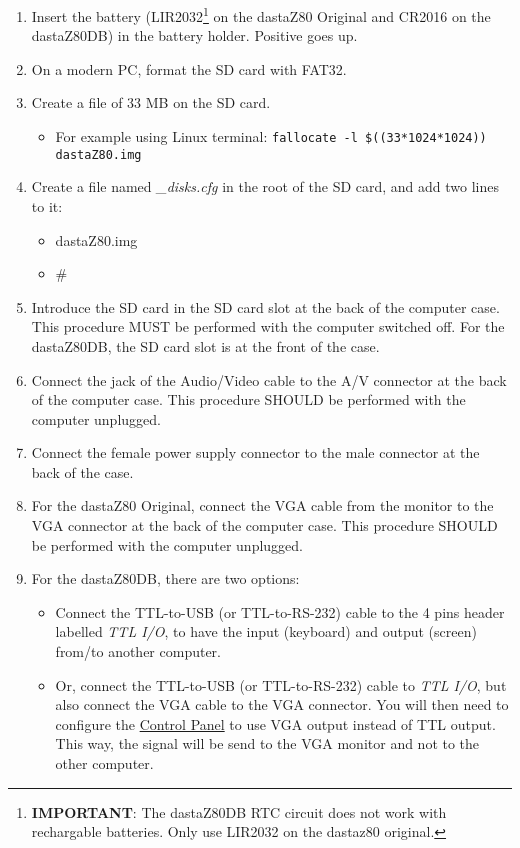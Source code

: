 \begin{enumerate}
    \item Insert the battery (LIR2032\footnote{\textbf{IMPORTANT}: The
    dastaZ80DB RTC circuit does not work with rechargable batteries. Only use
    LIR2032 on the dastaz80 original.} on the dastaZ80 Original and CR2016 on
    the dastaZ80DB) in the battery holder. Positive goes up.
    \item On a modern PC, format the SD card with FAT32.
    \item Create a file of 33 MB on the SD card.
    \begin{itemize}
        \item For example using Linux terminal: \texttt{fallocate -l \$((33*1024*1024)) dastaZ80.img}
    \end{itemize}
    \item Create a file named \textit{\_disks.cfg} in the root of the SD card,
    and add two lines to it:
    \begin{itemize}
        \item dastaZ80.img
        \item \#
    \end{itemize}
    \item Introduce the SD card in the SD card slot at the back of the
        computer case. This procedure MUST be performed with the computer
        switched off. For the dastaZ80DB, the SD card slot is at the front of
        the case.
    \item Connect the jack of the Audio/Video cable to the A/V connector at
        the back of the computer case. This procedure SHOULD be performed with
        the computer unplugged.
    \item Connect the female power supply connector to the male connector at
        the back of the case.
    \item For the dastaZ80 Original, connect the VGA cable from the monitor to
        the VGA connector at the back of the computer case. This procedure
        SHOULD be performed with the computer unplugged.
    \item For the dastaZ80DB, there are two options:
    \begin{itemize}
        \item Connect the TTL-to-USB (or TTL-to-RS-232) cable to the 4 pins
            header labelled \textit{TTL I/O}, to have the input (keyboard) and
            output (screen) from/to another computer.
        \item Or, connect the TTL-to-USB (or TTL-to-RS-232) cable to
            \textit{TTL I/O}, but also connect the VGA cable to the VGA
            connector. You will then need to configure the 
            \hyperref[subsubsec:controlpanel]{Control Panel} to use VGA output
            instead of TTL output. This way, the signal will be send to the VGA
            monitor and not to the other computer.
    \end{itemize}
\end{enumerate}

